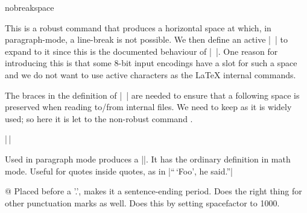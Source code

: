 %
 \begin{docCommand}{nobreakspace}{}
 \end{docCommand}
% 
   This is a robust command that produces a horizontal space at
   which, in paragraph-mode, a line-break is not possible.  We then
   define an active |~| to expand to it since this is the documented
   behaviour of |~|.  One reason for introducing this is that some
   8-bit input encodings have a slot for such a space and we do not
   want to use active characters as the \LaTeX{} internal commands.

   The braces in the definition of |~| are needed to ensure that a
   following space is preserved when reading to/from internal files.
%
   We need to keep  as it is widely used; so here it is
   let to the non-robust command .
%   
 

%

|\,|

   Used in paragraph mode produces a |\thinspace|.  It has the
   ordinary definition in math mode.  Useful for quotes inside quotes,
   as in  |``\,`Foo', he said.''|
    \begin{teX}
\DeclareRobustCommand{\,}{%
   \relax\ifmmode\mskip\thinmuskip\else\thinspace\fi
}
    \end{teX}


\begin{docCommand}{@}{}
     Placed before a '.', makes it a sentence-ending period.  Does the
     right thing for other punctuation marks as well.  Does this by
     setting spacefactor to 1000.
    \begin{teX}
\def\@{\spacefactor\@m}
    \end{teX}
 \end{docCommand}

